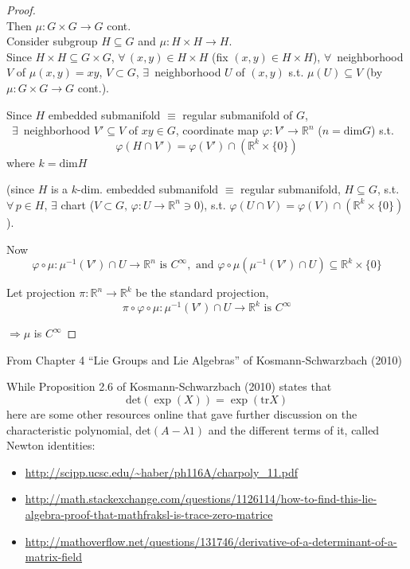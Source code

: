 \begin{proof}
\quad \\ 
Then $\mu : G \times G \to G$ cont.  \\
Consider subgroup $H\subseteq G$ and $\mu : H \times H \to H$. \\
Since $H\times H \subseteq G \times G$, $\forall \, (x,y) \in H \times H$ (fix $(x,y) \in H\times H$), $\forall \, $ neighborhood $V$ of $\mu(x,y) = xy$, $V\subset G$, $\exists \, $ neighborhood $U$ of $(x,y)$ s.t. $\mu(U) \subseteq V$ (by $\mu: G \times G \to G$ cont.).

Since $H$ embedded submanifold $\equiv $ regular submanifold of $G$,  \\
\qquad \, $\exists \, $ neighborhood $V' \subseteq V$ of $xy \in G$, coordinate map $\varphi:V' \to \mathbb{R}^n$ ($n = \text{dim}G$) s.t.
\[
\varphi(H \cap V') = \varphi(V') \cap (\mathbb{R}^k \times \lbrace 0 \rbrace)
\]
where $k = \text{dim}H$	
	
(since $H$ is a $k$-dim. embedded submanifold $\equiv$ regular submanifold, $H\subseteq G$, s.t. $\forall \, p \in H$, $\exists $ chart ($V \subset G, \, \varphi : U \to \mathbb{R}^n \ni 0$), s.t. $\varphi(U \cap V) = \varphi(V) \cap (\mathbb{R}^k \times \lbrace 0 \rbrace)$).

Now \\
\[
\varphi \circ \mu : \mu^{-1}(V') \cap U \to \mathbb{R}^n \text { is } C^{\infty}, \text{ and } \varphi \circ \mu(\mu^{-1}(V') \cap U) \subseteq \mathbb{R}^k \times \lbrace 0 \rbrace 
\]	

Let projection $\pi : \mathbb{R}^n \to \mathbb{R}^k$ be the standard projection, 
\[
\pi \circ \varphi \circ \mu : \mu^{-1}(V') \cap U \to \mathbb{R}^k \text{ is } C^{\infty}
\]
	
$\Longrightarrow \mu $ is $C^{\infty}$	
\end{proof}




From Chapter 4 ``Lie Groups and Lie Algebras'' of Kosmann-Schwarzbach (2010) \cite{dgdt:YKosmann-Schwarzbach2010}

While Proposition 2.6 of Kosmann-Schwarzbach (2010) \cite{dgdt:YKosmann-Schwarzbach2010} states that
\[
\text{det}(\exp(X)) = \exp{ (\text{tr}{X} ) }
\]
here are some other resources online that gave further discussion on the characteristic polynomial, $\text{det}(A-\lambda 1)$ and the different terms of it, called Newton identities:
\begin{itemize}
	\item \url{http://scipp.ucsc.edu/~haber/ph116A/charpoly_11.pdf}
	\item \url{http://math.stackexchange.com/questions/1126114/how-to-find-this-lie-algebra-proof-that-mathfraksl-is-trace-zero-matrice}
	\item \url{http://mathoverflow.net/questions/131746/derivative-of-a-determinant-of-a-matrix-field}
\end{itemize}

